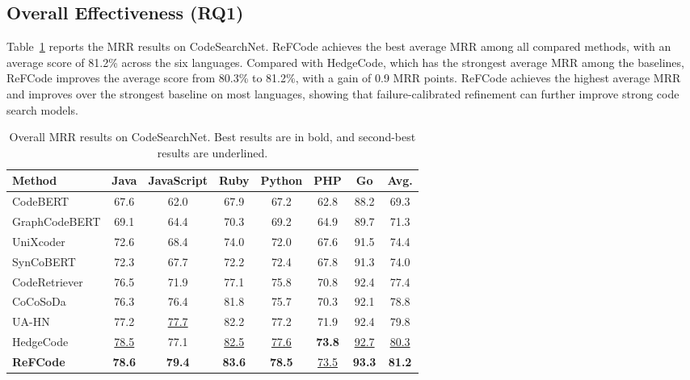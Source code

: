 \documentclass[10pt,conference]{IEEEtran}
\newcommand{\method}{ReFCode}
\newcommand{\best}[1]{\textbf{#1}}
\newcommand{\second}[1]{\underline{#1}}
\begin{document}
\subsection{Overall Effectiveness (RQ1)}
\label{sec:rq1_overall}

Table~\ref{tab:main_results} reports the MRR results on CodeSearchNet. \method{} achieves the best average MRR among all compared methods, with an average score of 81.2\% across the six languages. Compared with HedgeCode, which has the strongest average MRR among the baselines, \method{} improves the average score from 80.3\% to 81.2\%, with a gain of 0.9 MRR points. \method{} achieves the highest average MRR and improves over the strongest baseline on most languages, showing that failure-calibrated refinement can further improve strong code search models.

\begin{table}[!t]
\centering
\caption{Overall MRR results on CodeSearchNet. Best results are in bold, and second-best results are underlined.}
\label{tab:main_results}
\footnotesize
\setlength{\tabcolsep}{2.0pt}
\renewcommand{\arraystretch}{1.15}
\begin{tabular*}{\columnwidth}{@{\extracolsep{\fill}}lccccccc@{}}
\toprule
Method & Java & JavaScript & Ruby & Python & PHP & Go & Avg. \\
\midrule
CodeBERT       & 67.6 & 62.0 & 67.9 & 67.2 & 62.8 & 88.2 & 69.3 \\
GraphCodeBERT  & 69.1 & 64.4 & 70.3 & 69.2 & 64.9 & 89.7 & 71.3 \\
UniXcoder      & 72.6 & 68.4 & 74.0 & 72.0 & 67.6 & 91.5 & 74.4 \\
SynCoBERT      & 72.3 & 67.7 & 72.2 & 72.4 & 67.8 & 91.3 & 74.0 \\
CodeRetriever  & 76.5 & 71.9 & 77.1 & 75.8 & 70.8 & 92.4 & 77.4 \\
CoCoSoDa       & 76.3 & 76.4 & 81.8 & 75.7 & 70.3 & 92.1 & 78.8 \\
UA-HN          & 77.2 & \second{77.7} & 82.2 & 77.2 & 71.9 & 92.4 & 79.8 \\
HedgeCode      & \second{78.5} & 77.1 & \second{82.5} & \second{77.6} & \best{73.8} & \second{92.7} & \second{80.3} \\
\midrule
\textbf{\method{}} & \best{78.6} & \best{79.4} & \best{83.6} & \best{78.5} & \second{73.5} & \best{93.3} & \best{81.2} \\
\bottomrule
\end{tabular*}
\end{table}
\end{document}
